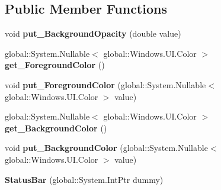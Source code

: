 \subsection*{Public Member Functions}
\begin{DoxyCompactItemize}
\item 
\mbox{\label{class_windows_1_1_u_i_1_1_view_management_1_1_status_bar_a6ab4fd00fb5d69e32bc38be43009139d}} 
void {\bfseries put\+\_\+\+Background\+Opacity} (double value)
\item 
\mbox{\label{class_windows_1_1_u_i_1_1_view_management_1_1_status_bar_a75d85c386b8ab944ec2aa2478a574562}} 
global\+::\+System.\+Nullable$<$ global\+::\+Windows.\+U\+I.\+Color $>$ {\bfseries get\+\_\+\+Foreground\+Color} ()
\item 
\mbox{\label{class_windows_1_1_u_i_1_1_view_management_1_1_status_bar_a870c24a2f4b4920a961161ce6662d40b}} 
void {\bfseries put\+\_\+\+Foreground\+Color} (global\+::\+System.\+Nullable$<$ global\+::\+Windows.\+U\+I.\+Color $>$ value)
\item 
\mbox{\label{class_windows_1_1_u_i_1_1_view_management_1_1_status_bar_a913df88438ec0972e82cf1b25b142912}} 
global\+::\+System.\+Nullable$<$ global\+::\+Windows.\+U\+I.\+Color $>$ {\bfseries get\+\_\+\+Background\+Color} ()
\item 
\mbox{\label{class_windows_1_1_u_i_1_1_view_management_1_1_status_bar_a6ecff49f6682ca50e73617ccc3a605c7}} 
void {\bfseries put\+\_\+\+Background\+Color} (global\+::\+System.\+Nullable$<$ global\+::\+Windows.\+U\+I.\+Color $>$ value)
\item 
\mbox{\label{class_windows_1_1_u_i_1_1_view_management_1_1_status_bar_a65d3147572b09fbe272cd6647bfd1e34}} 
{\bfseries Status\+Bar} (global\+::\+System.\+Int\+Ptr dummy)
\item 
\mbox{\label{class_windows_1_1_u_i_1_1_view_management_1_1_status_bar_a6ab4fd00fb5d69e32bc38be43009139d}} 

\end{DoxyCompactItemize}
